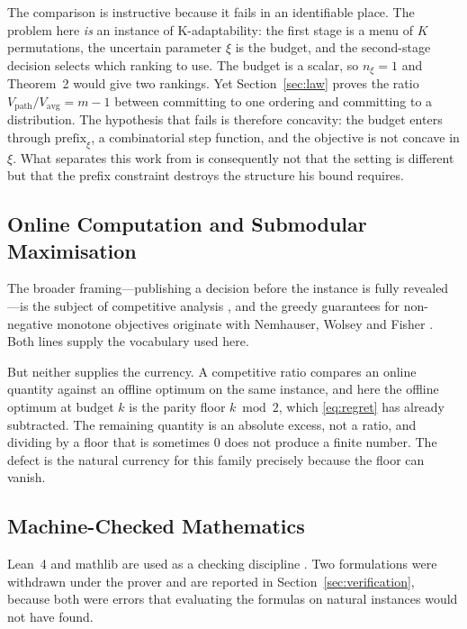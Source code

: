 \documentclass[conference]{IEEEtran}
\theoremstyle{definition}
\begin{document}
The comparison is instructive because it fails in an identifiable place. The problem here
\emph{is} an instance of K-adaptability: the first stage is a menu of $K$ permutations, the
uncertain parameter $\xi$ is the budget, and the second-stage decision selects which ranking
to use. The budget is a scalar, so $n_{\xi}=1$ and Theorem~2 would give two rankings. Yet
Section~\ref{sec:law} proves the ratio $V_{\mathrm{path}}/V_{\mathrm{avg}}=m-1$ between
committing to one ordering and committing to a distribution. The hypothesis that fails is
therefore concavity: the budget enters through $\mathrm{prefix}_{\xi}$, a combinatorial step
function, and the objective is not concave in $\xi$. What separates this work from
\cite{kurtz2026} is consequently not that the setting is different but that the prefix
constraint destroys the structure his bound requires.

\subsection{Online Computation and Submodular Maximisation}

The broader framing---publishing a decision before the instance is fully revealed---is the
subject of competitive analysis \cite{borodin1998}, and the greedy guarantees for
non-negative monotone objectives originate with Nemhauser, Wolsey and Fisher
\cite{nemhauser1978}. Both lines supply the vocabulary used here.

But neither supplies the currency. A competitive ratio compares an online quantity against an
offline optimum on the same instance, and here the offline optimum at budget $k$ is the
parity floor $k\bmod2$, which \eqref{eq:regret} has already subtracted. The remaining
quantity is an absolute excess, not a ratio, and dividing by a floor that is sometimes $0$
does not produce a finite number. The defect is the natural currency for this family
precisely because the floor can vanish.

\subsection{Machine-Checked Mathematics}

Lean~4 and mathlib are used as a checking discipline \cite{demoura2021,mathlib2020}. Two
formulations were withdrawn under the prover and are reported in
Section~\ref{sec:verification}, because both were errors that evaluating the formulas on
natural instances would not have found.
\end{document}
